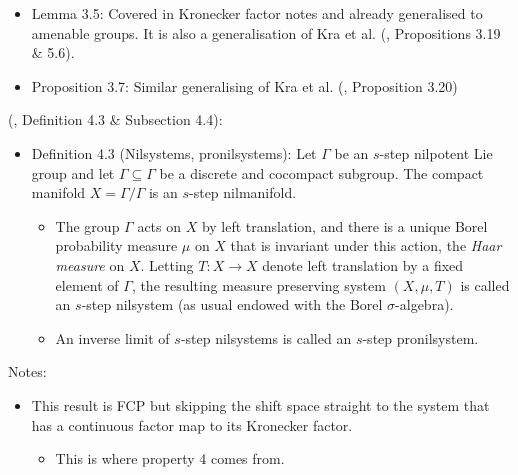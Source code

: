 \documentclass[
  british,
]{article}
\providecommand{\tightlist}{%
  \setlength{\itemsep}{0pt}\setlength{\parskip}{0pt}}
\theoremstyle{plain}
\theoremstyle{remark}
\newcommand{\Group}{{\Gamma}}
\newcommand{\Measure}{{\mu}}
\begin{document}
\begin{itemize}
\tightlist
\item
  Lemma 3.5: Covered in Kronecker factor notes and already generalised
  to amenable groups. It is also a generalisation of Kra et al.
  (, Propositions 3.19 \& 5.6).
\item
  Proposition 3.7: Similar generalising of Kra et al.
  (, Proposition 3.20)
\end{itemize}

(,
Definition 4.3 \& Subsection 4.4):

\begin{itemize}
\tightlist
\item
  Definition 4.3 (Nilsystems, pronilsystems): Let \(\Group\) be an
  \(s\)-step nilpotent Lie group and let \(\Gamma\subseteq\Group\) be a
  discrete and cocompact subgroup. The compact manifold
  \(X=\Group/\Gamma\) is an \(s\)-step nilmanifold.

  \begin{itemize}
  \tightlist
  \item
    The group \(\Group\) acts on \(X\) by left translation, and there is
    a unique Borel probability measure \(\Measure\) on \(X\) that is
    invariant under this action, the \emph{Haar measure} on \(X\).
    Letting \(T:X\rightarrow X\) denote left translation by a fixed
    element of \(\Group\), the resulting measure preserving system
    \((X,\Measure,T)\) is called an \(s\)-step nilsystem (as usual
    endowed with the Borel \(\sigma\)-algebra).
  \item
    An inverse limit of \(s\)-step nilsystems is called an \(s\)-step
    pronilsystem.
  \end{itemize}
\end{itemize}

Notes:

\begin{itemize}
\tightlist
\item
  This result is FCP but skipping the shift space straight to the system
  that has a continuous factor map to its Kronecker factor.

  \begin{itemize}
  \tightlist
  \item
    This is where property 4 comes from.
  \end{itemize}
\end{itemize}
\end{document}
